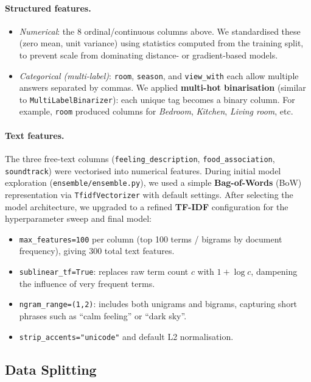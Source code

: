 \documentclass[11pt,letterpaper]{article}
\begin{document}
\paragraph{Structured features.}
\begin{itemize}
  \item \emph{Numerical}: the 8 ordinal/continuous columns above. We standardised
        these (zero mean, unit variance) using statistics computed from the training
        split, to prevent scale from dominating distance- or gradient-based models.
  \item \emph{Categorical (multi-label)}: \texttt{room}, \texttt{season}, and
        \texttt{view\_with} each allow multiple answers separated by commas.  We
        applied \textbf{multi-hot binarisation} (similar to \texttt{MultiLabelBinarizer}):
        each unique tag becomes a binary column. For example, \texttt{room} produced
        columns for \emph{Bedroom}, \emph{Kitchen}, \emph{Living room}, etc.
\end{itemize}

\paragraph{Text features.}
The three free-text columns (\texttt{feeling\_description}, \texttt{food\_association},
\texttt{soundtrack}) were vectorised into numerical features. During initial model
exploration (\texttt{ensemble/ensemble.py}), we used a simple \textbf{Bag-of-Words}
(BoW) representation via \texttt{TfidfVectorizer} with default settings. After
selecting the model architecture, we upgraded to a refined \textbf{TF-IDF}
configuration for the hyperparameter sweep and final model:
\begin{itemize}
  \item \texttt{max\_features=100} per column (top 100 terms / bigrams by document
        frequency), giving 300 total text features.
  \item \texttt{sublinear\_tf=True}: replaces raw term count $c$ with $1+\log c$,
        dampening the influence of very frequent terms.
  \item \texttt{ngram\_range=(1,2)}: includes both unigrams and bigrams, capturing
        short phrases such as ``calm feeling'' or ``dark sky''.
  \item \texttt{strip\_accents="unicode"} and default L2 normalisation.
\end{itemize}

\subsection{Data Splitting}
\end{document}
